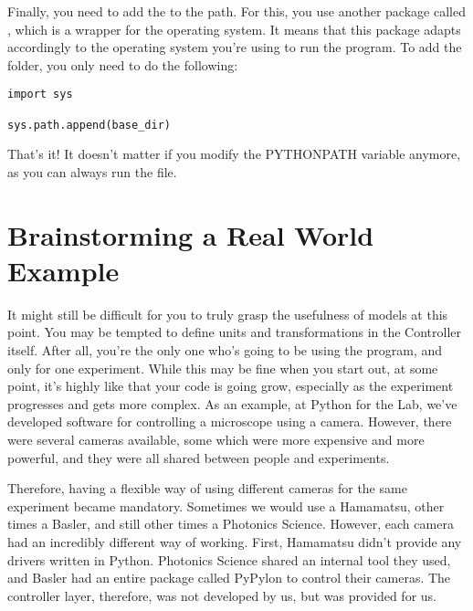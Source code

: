Finally, you need to add the  to the path. For this, you use another package called , which is a wrapper for the operating system. It means that this package adapts accordingly to the operating system you're using to run the program. To add the folder, you only need to do the following:

\begin{verbatim}
import sys

sys.path.append(base_dir)
\end{verbatim}

That's it! It doesn't matter if you modify the PYTHONPATH variable anymore, as you can always run the  file.


\section{Brainstorming a Real World Example}\label{sec:real-world-model}
It might still be difficult for you to truly grasp the usefulness of models at this point. You may be tempted to define units and transformations in the Controller itself. After all, you're the only one who's going to be using the program, and only for one experiment. While this may be fine when you start out, at some point, it's highly like that your code is going grow, especially as the experiment progresses and gets more complex. As an example, at Python for the Lab, we've developed software for controlling a microscope using a camera. However, there were several cameras available, some which were more expensive and more powerful, and they were all shared between people and experiments.

Therefore, having a flexible way of using different cameras for the same experiment became mandatory. Sometimes we would use a Hamamatsu, other times a Basler, and still other times a Photonics Science. However, each camera had an incredibly different way of working. First, Hamamatsu didn't provide any drivers written in Python. Photonics Science shared an internal tool they used, and Basler had an entire package called PyPylon to control their cameras. The controller layer, therefore, was not developed by us, but was provided for us.

